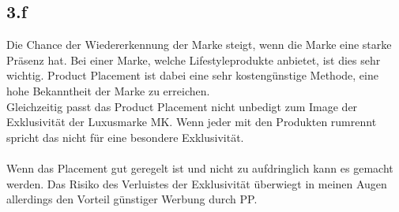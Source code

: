 \subsection{3.f}
    Die Chance der Wiedererkennung der Marke steigt, wenn die Marke eine starke Präsenz hat. Bei einer Marke, welche Lifestyleprodukte anbietet, ist dies sehr wichtig. Product Placement ist dabei eine sehr kostengünstige Methode, eine hohe Bekanntheit der Marke zu erreichen.\\
    Gleichzeitig passt das Product Placement nicht unbedigt zum Image der Exklusivität der Luxusmarke MK. Wenn jeder mit den Produkten rumrennt spricht das nicht für eine besondere Exklusivität. \\
    \ \\
    Wenn das Placement gut geregelt ist und nicht zu aufdringlich kann es gemacht werden. Das Risiko des Verluistes der Exklusivität überwiegt in meinen Augen allerdings den Vorteil günstiger Werbung durch PP.
